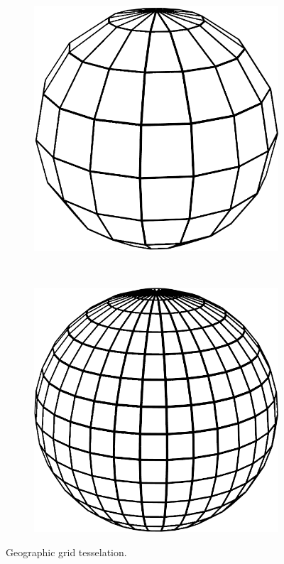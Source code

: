 \begin{figure}
\begin{subfigure}[b]{0.2\textwidth}
        \includegraphics[width=\textwidth]{figures/tessellation/tessellation_geo2.png}
    \end{subfigure}
    ~ %
    \begin{subfigure}[b]{0.2\textwidth}
        \includegraphics[width=\textwidth]{figures/tessellation/tessellation_geo3.png}
    \end{subfigure}
    \caption{Geographic grid tesselation.}
    \label{fig:tesselation_geo}
\end{figure}

